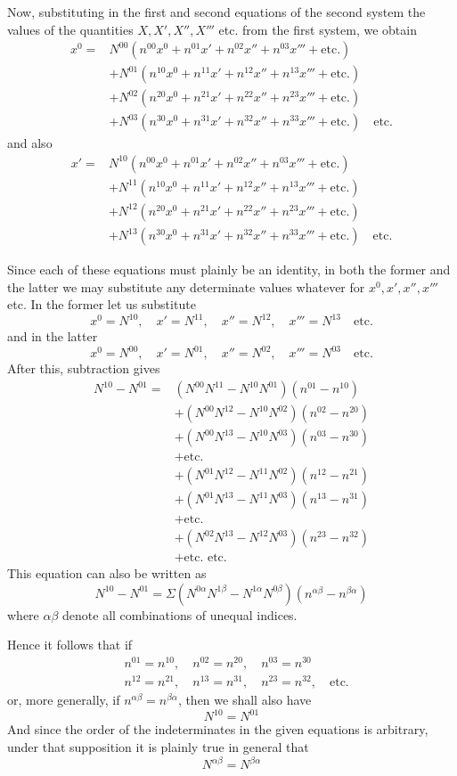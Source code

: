 Now, substituting in the first and second equations of the second system the values of the quantities \(X,X',X'',X'''\) etc. from the first system, we obtain
\[
\begin{aligned}
x^0={}&N^{00}(n^{00}x^0+n^{01}x'+n^{02}x''+n^{03}x'''+\text{etc.})\\
&+N^{01}(n^{10}x^0+n^{11}x'+n^{12}x''+n^{13}x'''+\text{etc.})\\
&+N^{02}(n^{20}x^0+n^{21}x'+n^{22}x''+n^{23}x'''+\text{etc.})\\
&+N^{03}(n^{30}x^0+n^{31}x'+n^{32}x''+n^{33}x'''+\text{etc.})\quad\text{etc.}
\end{aligned}
\]
and also
\[
\begin{aligned}
x'={}&N^{10}(n^{00}x^0+n^{01}x'+n^{02}x''+n^{03}x'''+\text{etc.})\\
&+N^{11}(n^{10}x^0+n^{11}x'+n^{12}x''+n^{13}x'''+\text{etc.})\\
&+N^{12}(n^{20}x^0+n^{21}x'+n^{22}x''+n^{23}x'''+\text{etc.})\\
&+N^{13}(n^{30}x^0+n^{31}x'+n^{32}x''+n^{33}x'''+\text{etc.})\quad\text{etc.}
\end{aligned}
\]

Since each of these equations must plainly be an identity, in both the former and the latter we may substitute any determinate values whatever for \(x^0,x',x'',x'''\) etc. In the former let us substitute
\[
x^0=N^{10},\quad x'=N^{11},\quad x''=N^{12},\quad x'''=N^{13}\quad\text{etc.}
\]
and in the latter
\[
x^0=N^{00},\quad x'=N^{01},\quad x''=N^{02},\quad x'''=N^{03}\quad\text{etc.}
\]
After this, subtraction gives
\[
\begin{aligned}
N^{10}-N^{01}={}&(N^{00}N^{11}-N^{10}N^{01})(n^{01}-n^{10})\\
&+(N^{00}N^{12}-N^{10}N^{02})(n^{02}-n^{20})\\
&+(N^{00}N^{13}-N^{10}N^{03})(n^{03}-n^{30})\\
&+\text{etc.}\\
&+(N^{01}N^{12}-N^{11}N^{02})(n^{12}-n^{21})\\
&+(N^{01}N^{13}-N^{11}N^{03})(n^{13}-n^{31})\\
&+\text{etc.}\\
&+(N^{02}N^{13}-N^{12}N^{03})(n^{23}-n^{32})\\
&+\text{etc. etc.}
\end{aligned}
\]
This equation can also be written as
\[
N^{10}-N^{01}=\Sigma(N^{0\alpha}N^{1\beta}-N^{1\alpha}N^{0\beta})(n^{\alpha\beta}-n^{\beta\alpha})
\]
where \(\alpha\beta\) denote all combinations of unequal indices.

Hence it follows that if
\[
\begin{aligned}
&n^{01}=n^{10},\quad n^{02}=n^{20},\quad n^{03}=n^{30}\\
&n^{12}=n^{21},\quad n^{13}=n^{31},\quad n^{23}=n^{32},\quad\text{etc.}
\end{aligned}
\]
or, more generally, if \(n^{\alpha\beta}=n^{\beta\alpha}\), then we shall also have
\[
N^{10}=N^{01}
\]
And since the order of the indeterminates in the given equations is arbitrary, under that supposition it is plainly true in general that
\[
N^{\alpha\beta}=N^{\beta\alpha}
\]
